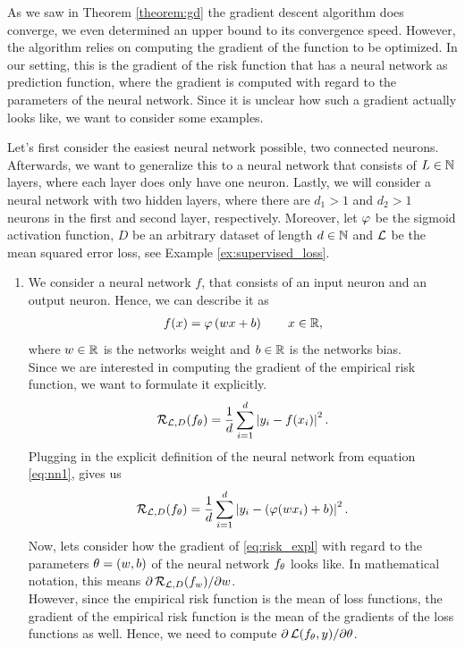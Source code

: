 As we saw in  Theorem \ref{theorem:gd} the gradient descent algorithm does converge, we even determined an upper bound to its convergence speed. However, the algorithm relies on computing the gradient of the function to be optimized. In our setting, this is the gradient of the risk function that has a neural network as prediction function, where the gradient is computed with regard to the parameters of the neural network. Since it is unclear how such a gradient actually looks like, we want to consider some examples.

\begin{example}\label{ex:nn_gradients_1dim}
Let's first consider the easiest neural network possible, two connected neurons. Afterwards, we want to generalize this to a neural network that consists of $L\in\operatorname{\mathbb{N}}$ layers, where each layer does only have one neuron. Lastly, we will consider a neural network with two hidden layers, where there are $d_1>1$ and $d_2>1$ neurons in the first and second layer, respectively. Moreover, let $\operatorname{\varphi}$ be the sigmoid activation function, $D$ be an arbitrary dataset of length $d\in\operatorname{\mathbb{N}}$ and $\operatorname{\mathcal{L}}$ be the mean squared error loss, see Example \ref{ex:supervised_loss}.
\begin{enumerate}
\item We consider a neural network $f$, that consists of an input neuron and an output neuron. Hence, we can describe it as
\begin{align}\label{eq:nn1}
f(x) = \operatorname{\varphi}\left(wx + b\right) \qquad x\in\operatorname{\mathbb{R}},
\end{align}
where $w\in\operatorname{\mathbb{R}}$ is the networks weight and $b\in\operatorname{\mathbb{R}}$ is the networks bias.\\
Since we are interested in computing the gradient of the empirical risk function, we want to formulate it explicitly.
\begin{align*}
\operatorname{\mathcal{R}}_{\operatorname{\mathcal{L}}, D} (f_\theta) = \frac{1}{d} \sum_{i=1}^d \left| y_i - f(x_i)\right|^2.
\end{align*}
Plugging in the explicit definition of the neural network from equation \eqref{eq:nn1}, gives us
\begin{align}\label{eq:risk_expl}
\operatorname{\mathcal{R}}_{\operatorname{\mathcal{L}}, D} (f_\theta) = \frac{1}{d} \sum_{i=1}^d \left| y_i - (\operatorname{\varphi}(wx_i) + b ) \right|^2.
\end{align}
Now, lets consider how the gradient of \eqref{eq:risk_expl} with regard to the parameters $\theta=(w, b)$ of the neural network $f_{\theta}$ looks like. In mathematical notation, this means $\partial \operatorname{\mathcal{R}}_{\operatorname{\mathcal{L}}, D}(f_w)/\partial w$.\\
However, since the empirical risk function is the mean of loss functions, the gradient of the empirical risk function is the mean of the gradients of the loss functions as well. Hence, we need to compute $\partial \operatorname{\mathcal{L}}(f_{\theta}, y)/\partial \theta$.\\

\end{enumerate}
\end{example}

